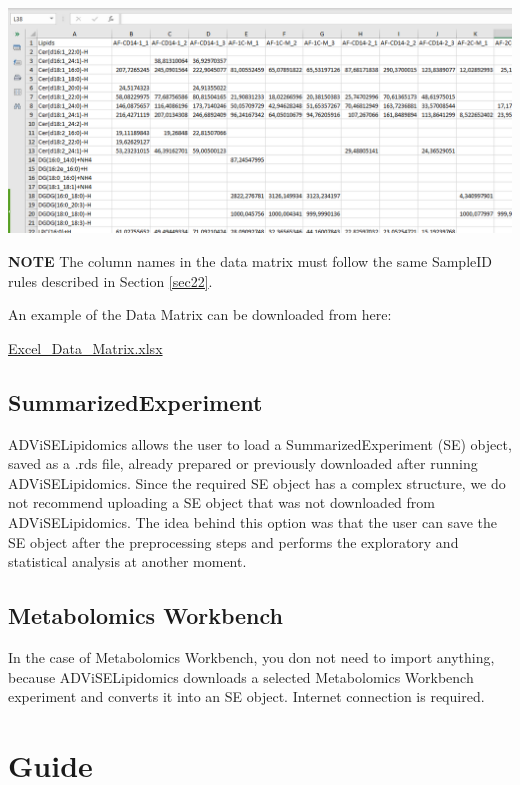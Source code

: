 \documentclass[
]{book}
\begin{document}
\includegraphics[width=1\linewidth]{images/excel_file_example}

\textbf{NOTE}
The column names in the data matrix must follow the same SampleID rules described in Section \ref{sec22}.

An example of the Data Matrix can be downloaded from here:

\href{https://github.com/ShinyFabio/ADViSELipidomics_book/raw/main/data_example/Excel_Data_Matrix.xlsx}{Excel\_Data\_Matrix.xlsx}

\hypertarget{sec26}{%
\section{SummarizedExperiment}\label{sec26}}

ADViSELipidomics allows the user to load a SummarizedExperiment (SE) object, saved as a .rds file, already prepared or previously downloaded after running ADViSELipidomics. Since the required SE object has a complex structure, we do not recommend uploading a SE object that was not downloaded from ADViSELipidomics. The idea behind this option was that the user can save the SE object after the preprocessing steps and performs the exploratory and statistical analysis at another moment.

\hypertarget{sec27}{%
\section{Metabolomics Workbench}\label{sec27}}

In the case of Metabolomics Workbench, you don not need to import anything, because ADViSELipidomics downloads a selected Metabolomics Workbench experiment and converts it into an SE object. Internet connection is required.

\hypertarget{guide}{%
\chapter{Guide}\label{guide}}
\end{document}
